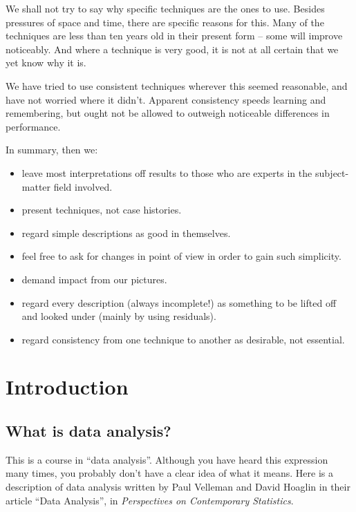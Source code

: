 \documentclass[
]{book}
\providecommand{\tightlist}{%
  \setlength{\itemsep}{0pt}\setlength{\parskip}{0pt}}
\begin{document}
We shall not try to say why specific techniques are the ones to use. Besides pressures of space and time, there are specific reasons for this. Many of the techniques are less than ten years old in their present form -- some will improve noticeably. And where a technique is very good, it is not at all certain that we yet know why it is.

We have tried to use consistent techniques wherever this seemed reasonable, and have not worried where it didn't. Apparent consistency speeds learning and remembering, but ought not be allowed to outweigh noticeable differences in performance.

In summary, then we:

\begin{itemize}
\tightlist
\item
  leave most interpretations off results to those who are experts in the subject-matter field involved.
\item
  present techniques, not case histories.
\item
  regard simple descriptions as good in themselves.
\item
  feel free to ask for changes in point of view in order to gain such simplicity.
\item
  demand impact from our pictures.
\item
  regard every description (always incomplete!) as something to be lifted off and looked under (mainly by using residuals).
\item
  regard consistency from one technique to another as desirable, not essential.
\end{itemize}

\hypertarget{introduction}{%
\chapter{Introduction}\label{introduction}}

\hypertarget{what-is-data-analysis}{%
\section{What is data analysis?}\label{what-is-data-analysis}}

This is a course in ``data analysis''. Although you have heard this expression many times, you probably don't have a clear idea of what it means. Here is a description of data analysis written by Paul Velleman and David Hoaglin in their article ``Data Analysis'', in \emph{Perspectives on Contemporary Statistics}.
\end{document}
